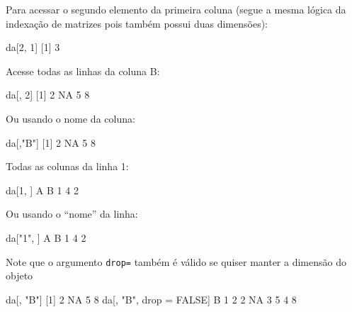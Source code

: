 \documentclass[10pt,a4paper]{book}
\newenvironment{Shaded}{\begin{snugshade}}{\end{snugshade}}
\newcommand{\DecValTok}[1]{\textcolor[rgb]{0.00,0.00,0.81}{#1}}
\newcommand{\StringTok}[1]{\textcolor[rgb]{0.31,0.60,0.02}{#1}}
\newcommand{\OtherTok}[1]{\textcolor[rgb]{0.56,0.35,0.01}{#1}}
\newcommand{\NormalTok}[1]{#1}
\begin{document}
Para acessar o segundo elemento da primeira coluna (segue a mesma lógica
da indexação de matrizes pois também possui duas dimensões):

\begin{Shaded}
\begin{Highlighting}[]
\NormalTok{da[}\DecValTok{2}\NormalTok{, }\DecValTok{1}\NormalTok{]}
\NormalTok{[}\DecValTok{1}\NormalTok{] }\DecValTok{3}
\end{Highlighting}
\end{Shaded}

Acesse todas as linhas da coluna B:

\begin{Shaded}
\begin{Highlighting}[]
\NormalTok{da[, }\DecValTok{2}\NormalTok{]}
\NormalTok{[}\DecValTok{1}\NormalTok{]  }\DecValTok{2} \OtherTok{NA}  \DecValTok{5}  \DecValTok{8}
\end{Highlighting}
\end{Shaded}

Ou usando o nome da coluna:

\begin{Shaded}
\begin{Highlighting}[]
\NormalTok{da[,}\StringTok{"B"}\NormalTok{]}
\NormalTok{[}\DecValTok{1}\NormalTok{]  }\DecValTok{2} \OtherTok{NA}  \DecValTok{5}  \DecValTok{8}
\end{Highlighting}
\end{Shaded}

Todas as colunas da linha 1:

\begin{Shaded}
\begin{Highlighting}[]
\NormalTok{da[}\DecValTok{1}\NormalTok{, ]}
\NormalTok{  A B}
\DecValTok{1} \DecValTok{4} \DecValTok{2}
\end{Highlighting}
\end{Shaded}

Ou usando o ``nome'' da linha:

\begin{Shaded}
\begin{Highlighting}[]
\NormalTok{da[}\StringTok{"1"}\NormalTok{, ]}
\NormalTok{  A B}
\DecValTok{1} \DecValTok{4} \DecValTok{2}
\end{Highlighting}
\end{Shaded}

Note que o argumento \texttt{drop=} também é válido se quiser manter a
dimensão do objeto

\begin{Shaded}
\begin{Highlighting}[]
\NormalTok{da[, }\StringTok{"B"}\NormalTok{]}
\NormalTok{[}\DecValTok{1}\NormalTok{]  }\DecValTok{2} \OtherTok{NA}  \DecValTok{5}  \DecValTok{8}
\NormalTok{da[, }\StringTok{"B"}\NormalTok{, drop =}\StringTok{ }\OtherTok{FALSE}\NormalTok{]}
\NormalTok{   B}
\DecValTok{1}  \DecValTok{2}
\DecValTok{2} \OtherTok{NA}
\DecValTok{3}  \DecValTok{5}
\DecValTok{4}  \DecValTok{8}
\end{Highlighting}
\end{Shaded}
\end{document}
